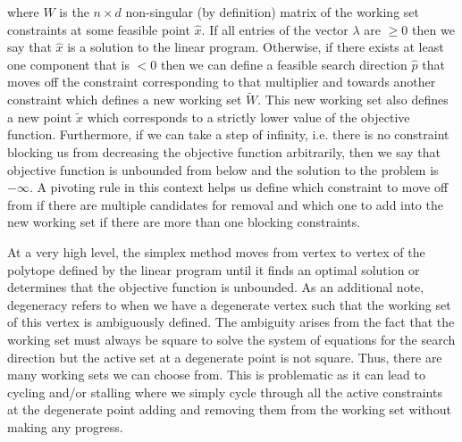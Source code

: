 \documentclass{standalone}
\begin{document}
where $W$ is the $n\times d$ non-singular (by definition) matrix of the working set constraints at some feasible point $\hat{x}$. If all entries of the vector $\lambda$ are $\ge0$ then we say that $\hat{x}$ is a solution to the linear program. Otherwise, if there exists at least one component that is $<0$ then we can define a feasible search direction $\hat{p}$ that moves off the constraint corresponding to that multiplier and towards another constraint which defines a new working set $\tilde{W}$. This new working set also defines a new point $\tilde{x}$ which corresponds to a strictly lower value of the objective function. Furthermore, if we can take a step of infinity, i.e. there is no constraint blocking us from decreasing the objective function arbitrarily, then we say that objective function is unbounded from below and the solution to the problem is $-\infty$. A pivoting rule in this context helps us define which constraint to move off from if there are multiple candidates for removal and which one to add into the new working set if there are more than one blocking constraints.\par
At a very high level, the simplex method moves from vertex to vertex of the polytope defined by the linear program until it finds an optimal solution or determines that the objective function is unbounded. As an additional note, degeneracy refers to when we have a degenerate vertex such that the working set of this vertex is ambiguously defined. The ambiguity arises from the fact that the working set must always be square to solve the system of equations for the search direction but the active set at a degenerate point is not square. Thus, there are many working sets we can choose from. This is problematic as it can lead to cycling and/or stalling where we simply cycle through all the active constraints at the degenerate point adding and removing them from the working set without making any progress.\par
\end{document}
